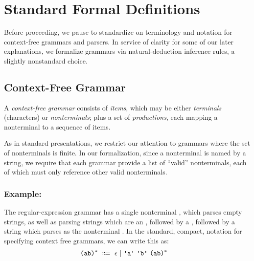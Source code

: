 
\section{Standard Formal Definitions} \label{sec:standard-definitions}
  Before proceeding, we pause to standardize on terminology and notation for context-free grammars and parsers.  In service of clarity for some of our later explanations, we formalize grammars via natural-deduction inference rules, a slightly nonstandard choice.

  \subsection{Context-Free Grammar}
    A \emph{context-free grammar} consists of \emph{items}, which may be either \emph{terminals} (characters) or \emph{nonterminals}; plus a set of \emph{productions}, each mapping a nonterminal to a sequence of items.
    
    As in standard presentations, we restrict our attention to grammars where the set of nonterminals is finite.  In our formalization, since a nonterminal is named by a string, we require that each grammar provide a list of ``valid'' nonterminals, each of which must only reference other valid nonterminals.

    \subsubsection{Example: \texorpdfstring{}{(ab)*}}
      The regular-expression grammar  has a single nonterminal , which parses empty strings, as well as parsing strings which are an , followed by a , followed by a string which parses as the nonterminal .  In the standard, compact, notation for specifying context free grammars, we can write this as:
      \begin{align*}
      &\nt{(ab)\ensuremath{^*}}~\Coloneqq~\epsilon~|~\terminal{a}~\terminal{b}~\nt{(ab)\ensuremath{^*}}
      \end{align*}
    
